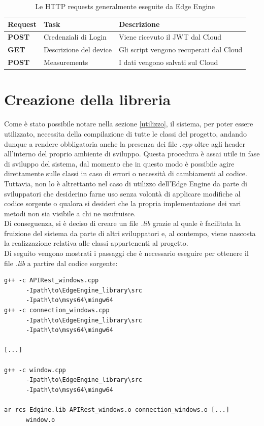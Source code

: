 \begin{table}[H]
	\centering
	\begin{tabular}{|l|l|l|}
		\hline
		\textbf{Request} & \textbf{Task} & \textbf{Descrizione}\\
		\hline
		\textbf{POST} & Credenziali di Login & Viene ricevuto il JWT dal Cloud\\
		\hline
		\textbf{GET} & Descrizione del device & Gli script vengono recuperati dal Cloud\\
		\hline
		\textbf{POST} & Measurements & I dati vengono salvati sul Cloud\\	
		\hline
	\end{tabular}
	\caption{Le HTTP requests generalmente eseguite da Edge Engine}
	\label{loop}
\end{table}
\section{Creazione della libreria}
Come è stato possibile notare nella sezione \ref{utilizzo}, il sistema, per poter essere utilizzato, necessita della compilazione di tutte le classi del progetto, andando dunque a rendere obbligatoria anche la presenza dei file \textit{.cpp} oltre agli header all'interno del proprio ambiente di sviluppo. Questa procedura è assai utile in fase di sviluppo del sistema, dal momento che in questo modo è possibile agire direttamente sulle classi in caso di errori o necessità di cambiamenti al codice. Tuttavia, non lo è altrettanto nel caso di utilizzo dell'Edge Engine da parte di sviluppatori che desiderino farne uso senza volontà di applicare modifiche al codice sorgente o qualora si desideri che la propria implementazione dei vari metodi non sia visibile a chi ne usufruisce.\\
Di conseguenza, si è deciso di creare un file \textit{.lib} grazie al quale è facilitata la fruizione del sistema da parte di altri sviluppatori e, al contempo, viene nascosta la realizzazione relativa alle classi appartenenti al progetto.\\
Di seguito vengono mostrati i passaggi che è necessario eseguire per ottenere il file \textit{.lib} a partire dal codice sorgente:
\begin{verbatim}
g++ -c APIRest_windows.cpp 
      -Ipath\to\EdgeEngine_library\src 
      -Ipath\to\msys64\mingw64 
g++ -c connection_windows.cpp 
      -Ipath\to\EdgeEngine_library\src 
      -Ipath\to\msys64\mingw64 

[...]

g++ -c window.cpp
      -Ipath\to\EdgeEngine_library\src 
      -Ipath\to\msys64\mingw64 
 
ar rcs Edgine.lib APIRest_windows.o connection_windows.o [...] 
      window.o
\end{verbatim}
